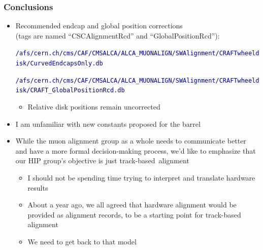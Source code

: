 \documentclass[compress]{beamer}
\begin{document}
\begin{frame}
\frametitle{Conclusions}
\begin{itemize}\setlength{\itemsep}{0.25 cm}
\item Recommended endcap and global position corrections \\ (tags are named ``CSCAlignmentRcd'' and ``GlobalPositionRcd''):

\textcolor{darkblue}{\tiny \tt /afs/cern.ch/cms/CAF/CMSALCA/ALCA\_MUONALIGN/SWAlignment/CRAFTwheeldisk/CurvedEndcapsOnly.db}

\textcolor{darkblue}{\tiny \tt /afs/cern.ch/cms/CAF/CMSALCA/ALCA\_MUONALIGN/SWAlignment/CRAFTwheeldisk/CRAFT\_GlobalPositionRcd.db}

\begin{itemize}
\item Relative disk positions remain uncorrected
\end{itemize}

\item I am unfamiliar with new constants proposed for the barrel

\item While the muon alignment group as a whole needs to communicate
  better and have a more formal decision-making process, we'd like to
  emphasize that our HIP group's objective is just \mbox{track-based alignment\hspace{-2 cm}}
\begin{itemize}\setlength{\itemsep}{0.1 cm}
\item I should not be spending time trying to interpret and translate hardware results
\item About a year ago, we all agreed that hardware alignment would be
  provided as alignment records, to be a starting point for track-based alignment
\item We need to get back to that model
\end{itemize}
\end{itemize}
\label{numpages}
\end{frame}


\end{document}

